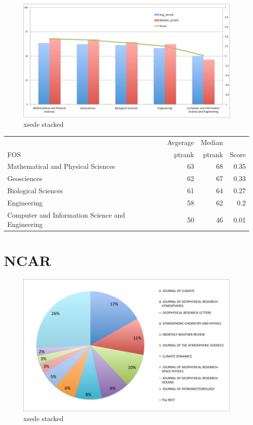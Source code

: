 \documentclass{sig-alternate}
\begin{document}
\begin{figure}[htb] 
  \centering 
    \includegraphics[width=1.0\textwidth]{images-new/c.pdf} 
  \caption{xsede stacked}\label{F:xsede-stacked} 
\end{figure} 


\begin{table}[h]
\begin{tiny}
\begin{tabular}{p{}rrr}
       & Avgerage  & Median  &  \\
FOS & ptrank & ptrank & Score \\
\hline
Mathematical and Physical Sciences  &  63  &  68  &  0.35 \\
Geosciences  &  62  &  67  &  0.33 \\
Biological Sciences  &  61  &  64  &  0.27 \\
Engineering  &  58  &  62  &  0.2 \\
Computer and Information Science and Engineering  &   50  &  46  & 0.01 \\
\end{tabular}
\end{tiny}
\end{table}


\section{NCAR}

\begin{figure}[htb] 
  \centering 
    \includegraphics[width=1.0\textwidth]{images-new/ncar-a.pdf} 
  \caption{xsede stacked}\label{F:xsede-stacked} 
\end{figure} 
\end{document}
